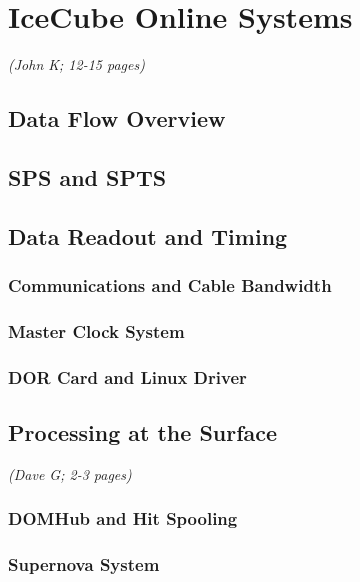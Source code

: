 
\section{IceCube Online Systems}
\textsl{(John K; 12-15 pages)}


\subsection{Data Flow Overview}

\subsection{SPS and SPTS}

\subsection{Data Readout and Timing}
\subsubsection{Communications and Cable Bandwidth}
\subsubsection{Master Clock System}
\subsubsection{DOR Card and Linux Driver}

\subsection{Processing at the Surface}
\textsl{(Dave G; 2-3 pages)}
\subsubsection{DOMHub and Hit Spooling}
\subsubsection{Supernova System}
